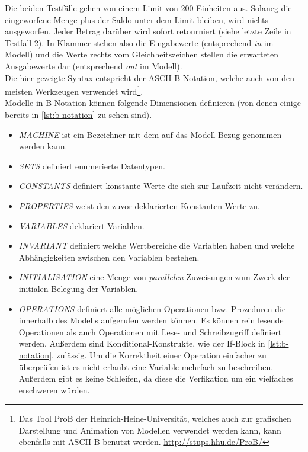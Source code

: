 Die beiden Testfälle gehen von einem Limit von 200 Einheiten aus. Solaneg die eingeworfene Menge plus der Saldo unter dem Limit bleiben, wird nichts ausgeworfen. Jeder Betrag darüber wird sofort retourniert (siehe letzte Zeile in Testfall 2). In Klammer stehen also die Eingabewerte (entsprechend \textit{in} im Modell) und die Werte rechts vom Gleichheitszeichen stellen die erwarteten Ausgabewerte dar (entsprechend \textit{out} im Modell).\\
Die hier gezeigte Syntax entspricht der ASCII B Notation, welche auch von den meisten Werkzeugen verwendet wird\footnote{Das Tool ProB der Heinrich-Heine-Universität, welches auch zur grafischen Darstellung und Animation von Modellen verwendet werden kann, kann ebenfalls mit ASCII B benutzt werden. \url{http://stups.hhu.de/ProB/}}.\\

Modelle in B Notation können folgende Dimensionen definieren (von denen einige bereits in \ref{lst:b-notation} zu sehen sind).

\begin{itemize}
\item \textit{MACHINE} ist ein Bezeichner mit dem auf das Modell Bezug genommen werden kann.
\item \textit{SETS} definiert enumerierte Datentypen.
\item \textit{CONSTANTS} definiert konstante Werte die sich zur Laufzeit nicht verändern.
\item \textit{PROPERTIES} weist den zuvor deklarierten Konstanten Werte zu.
\item \textit{VARIABLES} deklariert Variablen.
\item \textit{INVARIANT} definiert welche Wertbereiche die Variablen haben und welche Abhängigkeiten zwischen den Variablen bestehen.
\item \textit{INITIALISATION} eine Menge von \textit{parallelen} Zuweisungen zum Zweck der initialen Belegung der Variablen.
\item \textit{OPERATIONS} definiert alle möglichen Operationen bzw. Prozeduren die innerhalb des Modells aufgerufen werden können. Es können rein lesende Operationen als auch Operationen mit Lese- und Schreibzugriff definiert werden. Außerdem sind Konditional-Konstrukte, wie der If-Block in \ref{lst:b-notation}, zulässig. Um die Korrektheit einer Operation einfacher zu überprüfen ist es nicht erlaubt eine Variable mehrfach zu beschreiben. Außerdem gibt es keine Schleifen, da diese die Verfikation um ein vielfaches erschweren würden.
\end{itemize}

